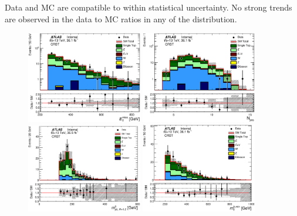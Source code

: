 \indent  Data and MC are compatible to within statistical uncertainty.  No strong trends are observed in the data to MC ratios in any of the distribution. \\

%  

\begin{figure}[h!]
\begin{center}
\includegraphics[width=0.45\textwidth]{figures/singleTop/postfit/Met_CRST_log.eps}
\includegraphics[width=0.45\textwidth]{figures/singleTop/postfit/NJets_CRST_log.eps}
\includegraphics[width=0.45\textwidth]{figures/singleTop/postfit/AntiKt12M_0__CRST.eps}
\includegraphics[width=0.45\textwidth]{figures/singleTop/postfit/MtBMin_CRST.eps}

\end{center}
\end{figure}
